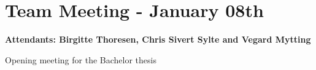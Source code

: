 \section*{Team Meeting - January 08th}
\textbf{Attendants: Birgitte Thoresen, Chris Sivert Sylte and Vegard Mytting}

Opening meeting for the Bachelor thesis